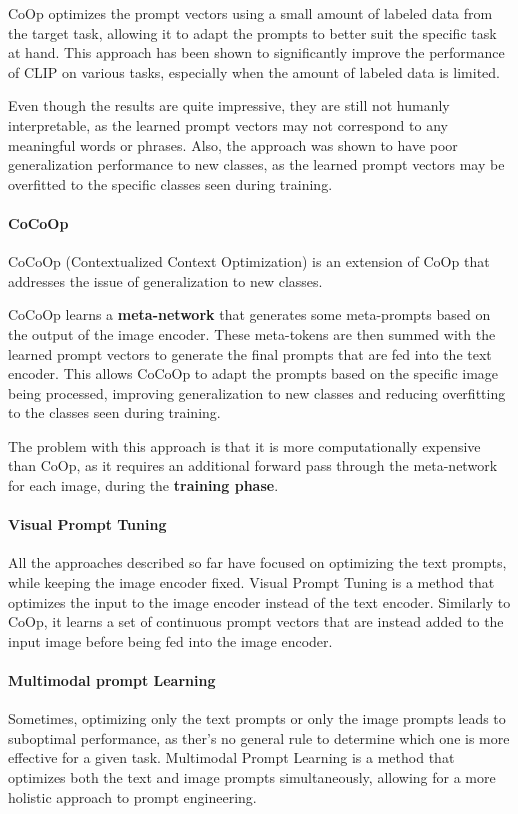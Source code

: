 CoOp optimizes the prompt vectors using a small amount of labeled data from the target task, allowing it to adapt the prompts to better suit the specific task at hand.
This approach has been shown to significantly improve the performance of CLIP on various tasks, especially when the amount of labeled data is limited.

Even though the results are quite impressive, they are still not humanly interpretable, as the learned prompt vectors may not correspond to any meaningful words or phrases.
Also, the approach was shown to have poor generalization performance to new classes, as the learned prompt vectors may be overfitted to the specific classes seen during training.

\paragraph{CoCoOp}
CoCoOp (Contextualized Context Optimization) is an extension of CoOp that addresses the issue of generalization to new classes. 

CoCoOp learns a \textbf{meta-network} that generates some meta-prompts based on the output of the image encoder. 
These meta-tokens are then summed with the learned prompt vectors to generate the final prompts that are fed into the text encoder.
This allows CoCoOp to adapt the prompts based on the specific image being processed, improving generalization to new classes and reducing overfitting to the classes seen during training.

The problem with this approach is that it is more computationally expensive than CoOp, as it requires an additional forward pass through the meta-network for each image,
during the \textbf{training phase}.

\paragraph{Visual Prompt Tuning}
All the approaches described so far have focused on optimizing the text prompts, while keeping the image encoder fixed.
Visual Prompt Tuning is a method that optimizes the input to the image encoder instead of the text encoder. 
Similarly to CoOp, it learns a set of continuous prompt vectors that are instead added to the input image before being fed into the image encoder.

\paragraph{Multimodal prompt Learning}
Sometimes, optimizing only the text prompts or only the image prompts leads to suboptimal performance, as ther's no general rule to determine which one is more effective for a given task.
Multimodal Prompt Learning is a method that optimizes both the text and image prompts simultaneously, allowing for a more holistic approach to prompt engineering.

